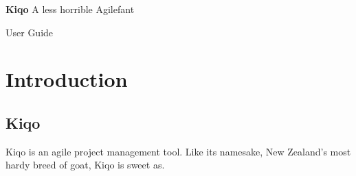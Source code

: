 \documentclass[11pt,fleqn]{book} %
\begin{document}

\begingroup
\thispagestyle{empty}
\centering
\vspace*{5cm}
\par\normalfont\fontsize{35}{35}\sffamily\selectfont
\textbf{Kiqo}
{\LARGE A less horrible Agilefant}\par %
\vspace*{1cm}
{\Huge User Guide}\par %
\endgroup


\tableofcontents %

\chapter{Introduction}

\section{Kiqo}
Kiqo is an agile project management tool. Like its namesake, New Zealand's most hardy breed of goat, Kiqo is sweet as.
\end{document}
